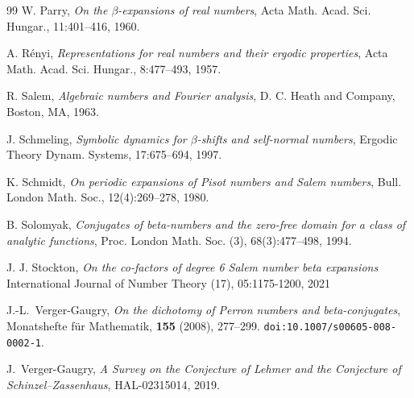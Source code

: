 \documentclass[12pt]{article}
\theoremstyle{plain}
\theoremstyle{remark}
\begin{document}
\begin{thebibliography}{99}
 W. Parry, \emph{On the $\beta$-expansions of real numbers}, Acta Math. Acad. Sci. Hungar., 11:401--416, 1960.

 A. Rényi, \emph{Representations for real numbers and their ergodic properties}, Acta Math. Acad. Sci. Hungar., 8:477--493, 1957.

 R. Salem, \emph{Algebraic numbers and Fourier analysis}, D. C. Heath and Company, Boston, MA, 1963.

 J. Schmeling, \emph{Symbolic dynamics for $\beta$-shifts and self-normal numbers}, Ergodic Theory Dynam. Systems, 17:675--694, 1997.

 K. Schmidt, \emph{On periodic expansions of Pisot numbers and Salem numbers}, Bull. London Math. Soc., 12(4):269--278, 1980.

 B. Solomyak, \emph{Conjugates of beta-numbers and the zero-free domain for a class of analytic functions}, Proc. London Math. Soc. (3), 68(3):477--498, 1994.

J. J. Stockton,
\emph{On the co-factors of degree 6 Salem number beta expansions}
International Journal of Number Theory (17), 05:1175-1200,  2021

J.-L.~Verger-Gaugry, \emph{On the dichotomy of Perron numbers and beta-conjugates}, 
Monatshefte für Mathematik, \textbf{155} (2008), 277--299.
\texttt{doi:10.1007/s00605-008-0002-1}.

J.~Verger-Gaugry,
\textit{A Survey on the Conjecture of Lehmer and the Conjecture of Schinzel--Zassenhaus},
HAL-02315014, 2019.
\end{thebibliography}
\end{document}
